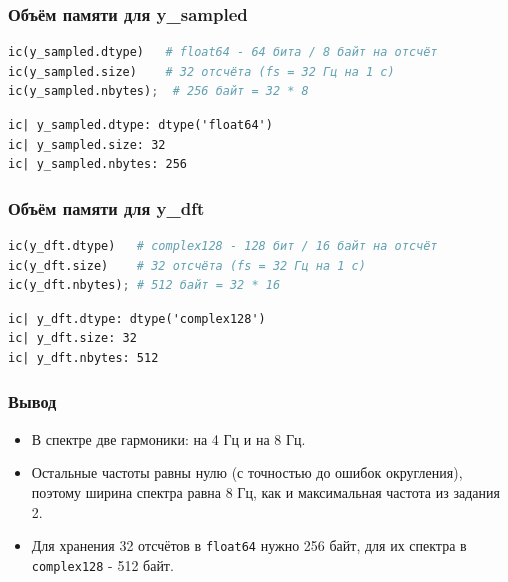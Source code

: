 \documentclass[a4paper,14pt,oneside,openany]{memoir}
\begin{document}
\subsubsection{Объём памяти для y\_sampled}

\begin{lstlisting}[language=Python, caption={Объём памяти массива отсчётов}]
ic(y_sampled.dtype)   # float64 - 64 бита / 8 байт на отсчёт
ic(y_sampled.size)    # 32 отсчёта (fs = 32 Гц на 1 с)
ic(y_sampled.nbytes);  # 256 байт = 32 * 8
\end{lstlisting}

\begin{lstlisting}[language={}, numbers=none, backgroundcolor=\color{white}, caption={Результат выполнения: объём памяти массива отсчётов}]
ic| y_sampled.dtype: dtype('float64')
ic| y_sampled.size: 32
ic| y_sampled.nbytes: 256
\end{lstlisting}

\subsubsection{Объём памяти для y\_dft}

\begin{lstlisting}[language=Python, caption={Объём памяти массива спектра}]
ic(y_dft.dtype)   # complex128 - 128 бит / 16 байт на отсчёт
ic(y_dft.size)    # 32 отсчёта (fs = 32 Гц на 1 с)
ic(y_dft.nbytes); # 512 байт = 32 * 16
\end{lstlisting}

\begin{lstlisting}[language={}, numbers=none, backgroundcolor=\color{white}, caption={Результат выполнения: объём памяти массива спектра}]
ic| y_dft.dtype: dtype('complex128')
ic| y_dft.size: 32
ic| y_dft.nbytes: 512
\end{lstlisting}

\subsubsection{Вывод}

\begin{itemize}
\item В спектре две гармоники: на 4 Гц и на 8 Гц.
\item Остальные частоты равны нулю (с точностью до ошибок округления), поэтому ширина спектра равна 8 Гц, как и максимальная частота из задания 2.
\item Для хранения 32 отсчётов в \texttt{float64} нужно 256 байт, для их спектра в \texttt{complex128} - 512 байт.
\end{itemize}
\end{document}
